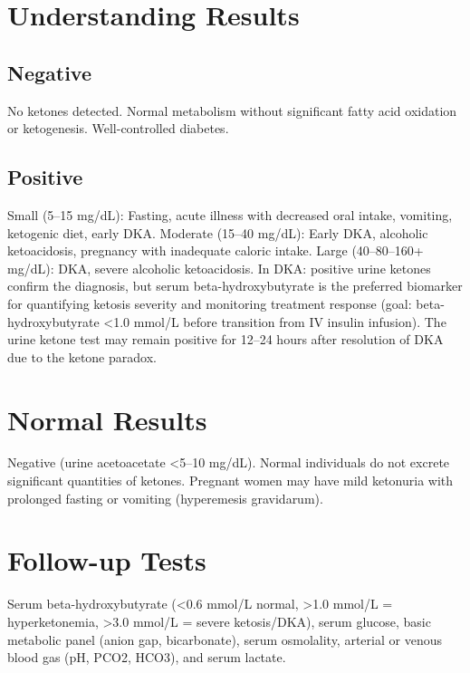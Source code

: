 \section*{Understanding Results}
\subsection*{Negative}
No ketones detected. Normal metabolism without significant fatty acid oxidation or ketogenesis. Well-controlled diabetes.
\subsection*{Positive}
Small (5--15 mg/dL): Fasting, acute illness with decreased oral intake, vomiting, ketogenic diet, early DKA. Moderate (15--40 mg/dL): Early DKA, alcoholic ketoacidosis, pregnancy with inadequate caloric intake. Large (40--80--160+ mg/dL): DKA, severe alcoholic ketoacidosis. In DKA: positive urine ketones confirm the diagnosis, but serum beta-hydroxybutyrate is the preferred biomarker for quantifying ketosis severity and monitoring treatment response (goal: beta-hydroxybutyrate <1.0 mmol/L before transition from IV insulin infusion). The urine ketone test may remain positive for 12--24 hours after resolution of DKA due to the ketone paradox.
\section*{Normal Results}
Negative (urine acetoacetate <5--10 mg/dL). Normal individuals do not excrete significant quantities of ketones. Pregnant women may have mild ketonuria with prolonged fasting or vomiting (hyperemesis gravidarum).
\section*{Follow-up Tests}
Serum beta-hydroxybutyrate (<0.6 mmol/L normal, >1.0 mmol/L = hyperketonemia, >3.0 mmol/L = severe ketosis/DKA), serum glucose, basic metabolic panel (anion gap, bicarbonate), serum osmolality, arterial or venous blood gas (pH, PCO2, HCO3), and serum lactate.
